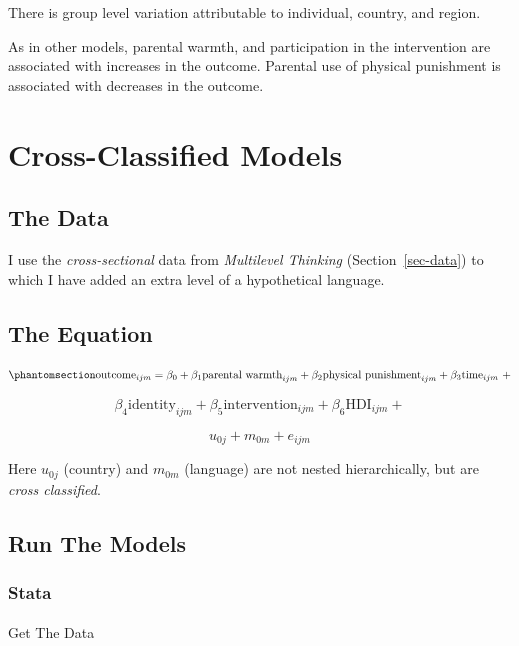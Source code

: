 \documentclass[
  letterpaper,
  DIV=11,
  numbers=noendperiod]{scrreprt}
\makeatletter
\let\oldparagraph\paragraph
\renewcommand{\paragraph}{
    \@ifstar
      \xxxParagraphStar
      \xxxParagraphNoStar
  }
\newcommand{\xxxParagraphStar}[1]{\oldparagraph*{#1}\mbox{}}
\newcommand{\xxxParagraphNoStar}[1]{\oldparagraph{#1}\mbox{}}
\makeatother
\begin{document}
There is group level variation attributable to individual, country, and
region.

As in other models, parental warmth, and participation in the
intervention are associated with increases in the outcome. Parental use
of physical punishment is associated with decreases in the outcome.

\section{Cross-Classified Models}\label{cross-classified-models}

\subsection{The Data}\label{the-data-3}

I use the \emph{cross-sectional} data from \emph{Multilevel Thinking}
(Section~\ref{sec-data}) to which I have added an extra level of a
hypothetical language.

\subsection{The Equation}\label{the-equation-6}

\begin{equation}\phantomsection\label{eq-crossclassified-multilingual}{\text{outcome}_{ijm} = \beta_0 + \beta_1 \text{parental warmth}_{ijm} + \beta_2 \text{physical punishment}_{ijm} + \beta_3 \text{time}_{ijm} \ + }\end{equation}

\[\beta_4 \text{identity}_{ijm} + \beta_5 \text{intervention}_{ijm} + \beta_6 \text{HDI}_{ijm} +\]

\[u_{0j} + m_{0m} + e_{ijm}\]

Here \(u_{0j}\) (country) and \(m_{0m}\) (language) are not nested
hierarchically, but are \emph{cross classified}.

\subsection{Run The Models}\label{run-the-models-6}

\subsubsection{Stata}

\paragraph{Get The Data}\label{get-the-data-11}
\end{document}
